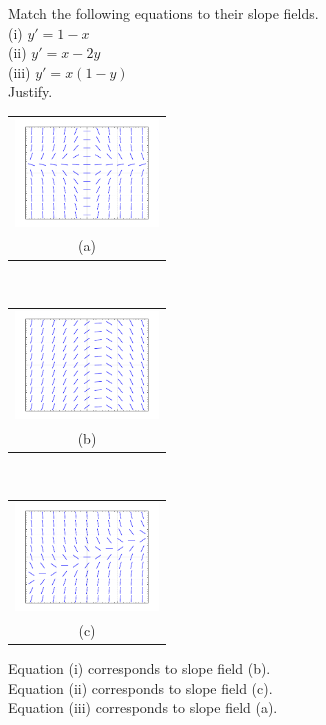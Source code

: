 {Match the following equations to their slope fields.\\
(i) $y'=1-x$\\
(ii) $y'=x-2y$\\
(iii) $y' = x(1-y)$\\
Justify.

\medskip

\begin{tabular}{c}
\includegraphics[width=1.5in]{figures/yprimex1minusyslope}\\
(a)
\end{tabular}\\
\begin{tabular}{c}
\includegraphics[width=1.5in]{figures/yprime1minusxslope}\\
(b)
\end{tabular}\\
\begin{tabular}{c}
\includegraphics[width=1.5in]{figures/yprimexminus2yslope}\\
(c)
\end{tabular}
}
{Equation (i) corresponds to slope field (b).\\
Equation (ii) corresponds to slope field (c).\\
Equation (iii) corresponds to slope field (a).}